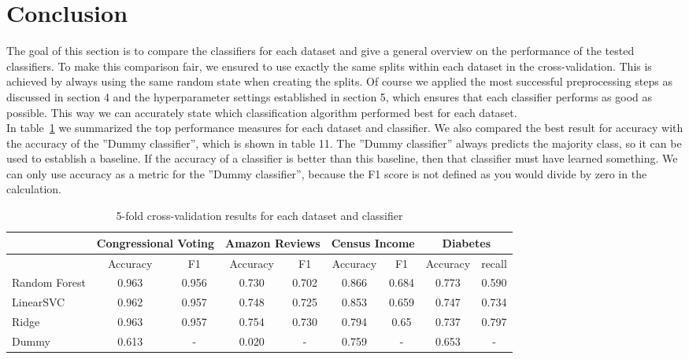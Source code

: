 \documentclass[a4paper,10pt]{article}
\begin{document}
\section{Conclusion}
The goal of this section is to compare the classifiers for each dataset and give a general overview on the
performance of the tested classifiers. To make this comparison fair, we ensured to use exactly the same
splits within each dataset in the cross-validation. This is achieved by always using the same random state
when creating the splits. Of course we applied the most successful preprocessing steps as discussed in
section 4 and the hyperparameter settings established in section 5, which ensures that each classifier
performs as good as possible. This way we can accurately state which classification algorithm performed
best for each dataset.\\
In table~\ref{tab:best_results} we summarized the top performance measures for each dataset and classifier. We also compared
the best result for accuracy with the accuracy of the ”Dummy classifier”, which is shown in table 11.
The ”Dummy classifier” always predicts the majority class, so it can be used to establish a baseline. If
the accuracy of a classifier is better than this baseline, then that classifier must have learned something.
We can only use accuracy as a metric for the ”Dummy classifier”, because the F1 score is not defined as
you would divide by zero in the calculation.

\begin{table}[h!]
\centering
\footnotesize
\begin{tabular}{|l|c|c|c|c|c|c|c|c|}
\hline
& \multicolumn{2}{c|}{Congressional Voting} & \multicolumn{2}{c|}{Amazon Reviews} & \multicolumn{2}{c|}{Census Income} & \multicolumn{2}{c|}{Diabetes} \\
\hline
& Accuracy & F1 & Accuracy & F1 & Accuracy & F1 & Accuracy & recall \\
\hline
Random Forest & 0.963 & 0.956 & 0.730 & 0.702 & 0.866 & 0.684 & 0.773 & 0.590 \\
\hline
LinearSVC & 0.962 & 0.957 & 0.748 & 0.725 & 0.853 & 0.659 & 0.747 & 0.734 \\
\hline
Ridge & 0.963 & 0.957 & 0.754 & 0.730 & 0.794 & 0.65 & 0.737 & 0.797 \\
\hline
Dummy & 0.613 & - & 0.020 &- & 0.759 & - & 0.653 & - \\
\hline
\end{tabular}
\vspace{0.3cm}
\caption{5-fold cross-validation results for each dataset and classifier}
\label{tab:best_results}
\end{table}
\end{document}
